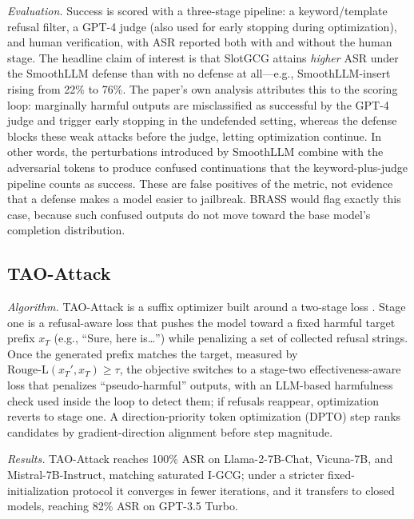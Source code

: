 \documentclass[conference]{IEEEtran}
\begin{document}
\emph{Evaluation.} Success is scored with a three-stage pipeline: a keyword/template refusal filter, a GPT-4 judge (also used for early stopping during optimization), and human verification, with ASR reported both with and without the human stage. The headline claim of interest is that SlotGCG attains \emph{higher} ASR under the SmoothLLM defense than with no defense at all---e.g., SmoothLLM-insert rising from 22\% to 76\%. The paper's own analysis attributes this to the scoring loop: marginally harmful outputs are misclassified as successful by the GPT-4 judge and trigger early stopping in the undefended setting, whereas the defense blocks these weak attacks before the judge, letting optimization continue. In other words, the perturbations introduced by SmoothLLM combine with the adversarial tokens to produce confused continuations that the keyword-plus-judge pipeline counts as success. These are false positives of the metric, not evidence that a defense makes a model easier to jailbreak. BRASS would flag exactly this case, because such confused outputs do not move toward the base model's completion distribution.

\subsection{TAO-Attack}

\emph{Algorithm.} TAO-Attack is a suffix optimizer built around a two-stage loss \cite{tao2024}. Stage one is a refusal-aware loss that pushes the model toward a fixed harmful target prefix \(x_T\) (e.g., ``Sure, here is\ldots'') while penalizing a set of collected refusal strings. Once the generated prefix matches the target, measured by \(\mathrm{Rouge\text{-}L}(x_T', x_T)\geq\tau\), the objective switches to a stage-two effectiveness-aware loss that penalizes ``pseudo-harmful'' outputs, with an LLM-based harmfulness check used inside the loop to detect them; if refusals reappear, optimization reverts to stage one. A direction-priority token optimization (DPTO) step ranks candidates by gradient-direction alignment before step magnitude.

\emph{Results.} TAO-Attack reaches 100\% ASR on Llama-2-7B-Chat, Vicuna-7B, and Mistral-7B-Instruct, matching saturated I-GCG; under a stricter fixed-initialization protocol it converges in fewer iterations, and it transfers to closed models, reaching 82\% ASR on GPT-3.5 Turbo.
\end{document}
